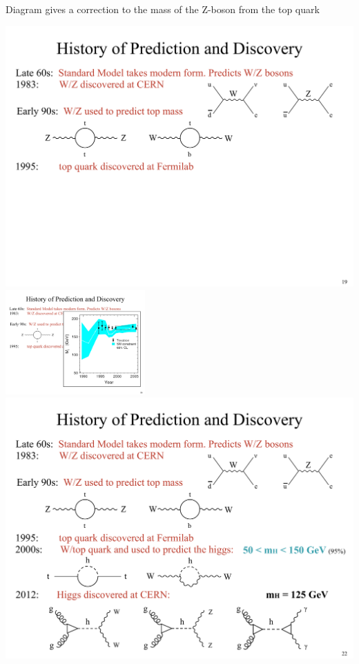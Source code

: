 {Diagram gives a correction to the mass of the Z-boson from the top quark


\bc
\includegraphics[width=1\textwidth]{./HistoryPredictionDiscovery.pdf}
\ec
\bc
\includegraphics[width=0.4\textwidth]{./TopPrediction.pdf}
\ec
\bc
\includegraphics[width=1\textwidth]{./HistoryPart2.pdf}
\ec

}
